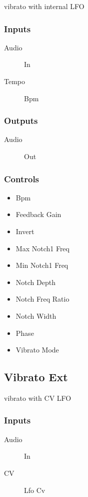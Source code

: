 vibrato with internal LFO



\subsubsection{Inputs}
\begin{description}
\item [Audio] In
\item [Tempo] Bpm
\end{description}

\subsubsection{Outputs}
\begin{description}
\item [Audio] Out
\end{description}

\subsubsection{Controls}
\begin{itemize}
\item Bpm
\item Feedback Gain
\item Invert
\item Max Notch1 Freq
\item Min Notch1 Freq
\item Notch Depth
\item Notch Freq Ratio
\item Notch Width
\item Phase
\item Vibrato Mode
\end{itemize}

\subsection{Vibrato Ext}

vibrato with CV LFO



\subsubsection{Inputs}
\begin{description}
\item [Audio] In
\item [CV] Lfo Cv
\end{description}


